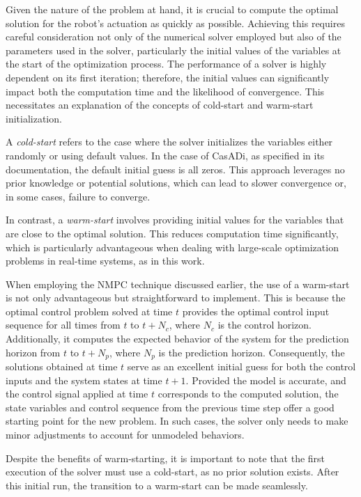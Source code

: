 Given the nature of the problem at hand, it is crucial to compute the optimal solution for the robot's actuation as quickly as possible. Achieving this requires careful consideration not only of the numerical solver employed but also of the parameters used in the solver, particularly the initial values of the variables at the start of the optimization process. The performance of a solver is highly dependent on its first iteration; therefore, the initial values can significantly impact both the computation time and the likelihood of convergence. This necessitates an explanation of the concepts of cold-start and warm-start initialization.

A \textit{cold-start} refers to the case where the solver initializes the variables either randomly or using default values. In the case of CasADi, as specified in its documentation, the default initial guess is all zeros. This approach leverages no prior knowledge or potential solutions, which can lead to slower convergence or, in some cases, failure to converge. 

In contrast, a \textit{warm-start} involves providing initial values for the variables that are close to the optimal solution. This reduces computation time significantly, which is particularly advantageous when dealing with large-scale optimization problems in real-time systems, as in this work.

When employing the NMPC technique discussed earlier, the use of a warm-start is not only advantageous but straightforward to implement. This is because the optimal control problem solved at time \( t \) provides the optimal control input sequence for all times from \( t \) to \( t+N_c \), where \( N_c \) is the control horizon. Additionally, it computes the expected behavior of the system for the prediction horizon from \( t \) to \( t+N_p \), where \( N_p \) is the prediction horizon. Consequently, the solutions obtained at time \( t \) serve as an excellent initial guess for both the control inputs and the system states at time \( t+1 \). Provided the model is accurate, and the control signal applied at time \( t \) corresponds to the computed solution, the state variables and control sequence from the previous time step offer a good starting point for the new problem. In such cases, the solver only needs to make minor adjustments to account for unmodeled behaviors.

Despite the benefits of warm-starting, it is important to note that the first execution of the solver must use a cold-start, as no prior solution exists. After this initial run, the transition to a warm-start can be made seamlessly.